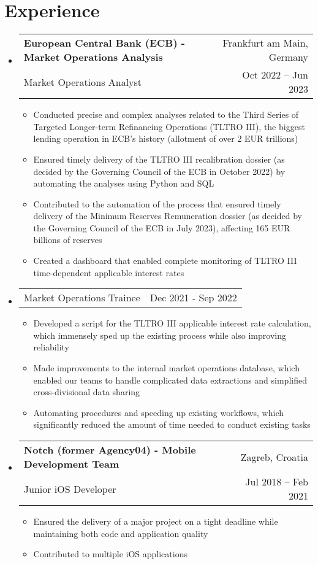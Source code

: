 \documentclass[letterpaper,11pt]{article}
\makeatletter
\newcommand{\resumeItem}[1]{
  \item\small{
    {#1 \vspace{-2pt}}
  }
}
\newcommand{\resumeSubheading}[4]{
  \vspace{-2pt}\item
    \begin{tabular*}{0.97\textwidth}[t]{l@{\extracolsep{\fill}}r}
      \textbf{#1} & #2 \\
      \small #3 & \small #4 \\
    \end{tabular*}\vspace{-7pt}
}
\newcommand{\resumeSubSubheading}[2]{
    \item
    \begin{tabular*}{0.97\textwidth}{l@{\extracolsep{\fill}}r}
      \small#1 & \small #2 \\
    \end{tabular*}\vspace{-7pt}
}
\newcommand{\resumeSubHeadingListStart}{\begin{itemize}[leftmargin=0.15in, label={}]}
\newcommand{\resumeSubHeadingListEnd}{\end{itemize}}
\newcommand{\resumeItemListStart}{\begin{itemize}}
\newcommand{\resumeItemListEnd}{\end{itemize}\vspace{-5pt}}
\makeatother
\begin{document}
\section{Experience}
  \resumeSubHeadingListStart

    \resumeSubheading
      {European Central Bank (ECB) - Market Operations Analysis}{Frankfurt am Main, Germany}
      {Market Operations Analyst}{Oct 2022 -- Jun 2023}
      \resumeItemListStart
        \resumeItem{Conducted precise and complex analyses related to the Third Series of Targeted Longer-term Refinancing Operations (TLTRO III), the biggest lending operation in ECB's history (allotment of over 2 EUR trillions)}
        \resumeItem{Ensured timely delivery of the TLTRO III recalibration dossier (as decided by the Governing Council of the ECB in October 2022) by automating the analyses using Python and SQL}
        \resumeItem{Contributed to the automation of the process that ensured timely delivery of the Minimum Reserves Remuneration dossier (as decided by the Governing Council of the ECB in July 2023), affecting 165 EUR billions of reserves}
        \resumeItem{Created a dashboard that enabled complete monitoring of TLTRO III time-dependent applicable interest rates}
      \resumeItemListEnd

   \resumeSubSubheading
    {Market Operations Trainee}{Dec 2021 - Sep 2022}
    \resumeItemListStart
       \resumeItem{Developed a script for the TLTRO III applicable interest rate calculation, which immensely sped up the existing process while also improving reliability}
       \resumeItem{Made improvements to the internal market operations database, which enabled our teams to handle complicated data extractions and simplified cross-divisional data sharing}
       \resumeItem{Automating procedures and speeding up existing workflows, which significantly reduced the amount of time needed to conduct existing tasks}
    \resumeItemListEnd

   \resumeSubheading
      {Notch (former Agency04) - Mobile Development Team}{Zagreb, Croatia}
      {Junior iOS Developer}{Jul 2018 -- Feb 2021}
      \resumeItemListStart
        \resumeItem{Ensured the delivery of a major project on a tight deadline while maintaining both code and application quality}
        \resumeItem{Contributed to multiple iOS applications}
      \resumeItemListEnd

  \resumeSubHeadingListEnd 
\end{document}
